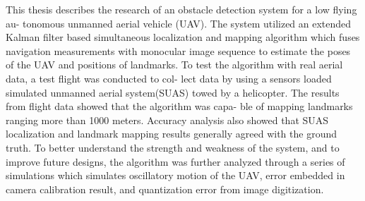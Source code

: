This thesis describes the research of an obstacle detection system for a low flying au-
tonomous unmanned aerial vehicle (UAV). The system utilized an extended Kalman
filter based simultaneous localization and mapping algorithm which fuses navigation
measurements with monocular image sequence to estimate the poses of the UAV and
positions of landmarks.
To test the algorithm with real aerial data, a test flight was conducted to col-
lect data by using a sensors loaded simulated unmanned aerial system(SUAS) towed
by a helicopter. The results from flight data showed that the algorithm was capa-
ble of mapping landmarks ranging more than 1000 meters. Accuracy analysis also
showed that SUAS localization and landmark mapping results generally agreed with
the ground truth.
To better understand the strength and weakness of the system, and to improve
future designs, the algorithm was further analyzed through a
series of simulations which simulates oscillatory motion of the UAV, error embedded
in camera calibration result, and quantization error from image digitization.
